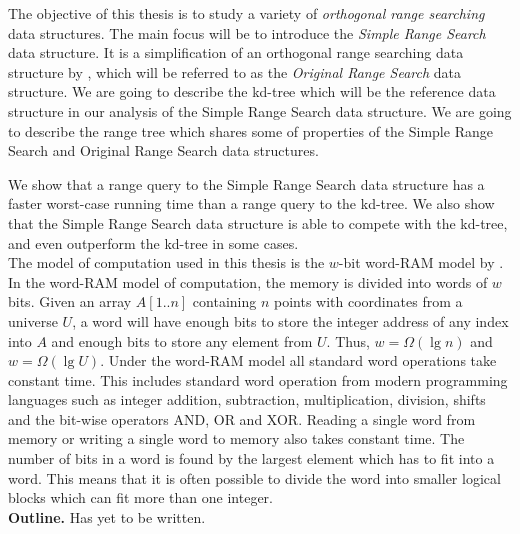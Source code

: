 The objective of this thesis is to study a variety of \emph{orthogonal range searching} data structures. The main focus will be to introduce the \emph{Simple Range Search} data structure. It is a simplification of an orthogonal range searching data structure by \citet{chanetal}, which will be referred to as the \emph{Original Range Search} data structure. We are going to describe the kd-tree which will be the reference data structure in our analysis of the Simple Range Search data structure. We are going to describe the range tree which shares some of properties of the Simple Range Search and Original Range Search data structures.

We show that a range query to the Simple Range Search data structure has a faster worst-case running time than a range query to the kd-tree. We also show that the Simple Range Search data structure is able to compete with the kd-tree, and even outperform the kd-tree in some cases.  \\ 


The model of computation used in this thesis is the $w$-bit word-RAM model by \citet{fredman}. In the word-RAM model of computation, the memory is divided into words of $w$ bits. Given an array $A[1..n]$ containing $n$ points with coordinates from a universe $U$, a word will have enough bits to store the integer address of any index into $A$ and enough bits to store any element from $U$. Thus, $w = \Omega(\lg n)$ and $w = \Omega(\lg U)$. Under the word-RAM model all standard word operations take constant time. This includes standard word operation from modern programming languages such as integer addition, subtraction, multiplication, division, shifts and the bit-wise operators AND, OR and XOR. Reading a single word from memory or writing a single word to memory also takes constant time. The number of bits in a word is found by the largest element which has to fit into a word. This means that it is often possible to divide the word into smaller logical blocks which can fit more than one integer.  \\


\noindent \textbf{Outline.} Has yet to be written. \\

